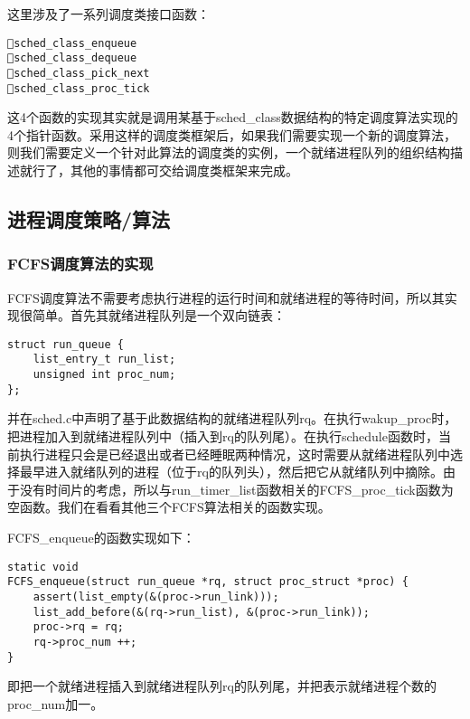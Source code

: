 这里涉及了一系列调度类接口函数：

\begin{lstlisting}
sched_class_enqueue
sched_class_dequeue
sched_class_pick_next
sched_class_proc_tick
\end{lstlisting}

这4个函数的实现其实就是调用某基于sched\_class数据结构的特定调度算法实现的4个指针函数。采用这样的调度类框架后，如果我们需要实现一个新的调度算法，则我们需要定义一个针对此算法的调度类的实例，一个就绪进程队列的组织结构描述就行了，其他的事情都可交给调度类框架来完成。

\subsection{进程调度策略/算法}\label{ux8fdbux7a0bux8c03ux5ea6ux7b56ux7565ux7b97ux6cd5}

\subsubsection{FCFS调度算法的实现}\label{fcfsux8c03ux5ea6ux7b97ux6cd5ux7684ux5b9eux73b0}

FCFS调度算法不需要考虑执行进程的运行时间和就绪进程的等待时间，所以其实现很简单。首先其就绪进程队列是一个双向链表：

\begin{lstlisting}
struct run_queue {
    list_entry_t run_list;
    unsigned int proc_num;
};
\end{lstlisting}

并在sched.c中声明了基于此数据结构的就绪进程队列rq。在执行wakup\_proc时，把进程加入到就绪进程队列中（插入到rq的队列尾）。在执行schedule函数时，当前执行进程只会是已经退出或者已经睡眠两种情况，这时需要从就绪进程队列中选择最早进入就绪队列的进程（位于rq的队列头），然后把它从就绪队列中摘除。由于没有时间片的考虑，所以与run\_timer\_list函数相关的FCFS\_proc\_tick函数为空函数。我们在看看其他三个FCFS算法相关的函数实现。

FCFS\_enqueue的函数实现如下：

\begin{lstlisting}
static void
FCFS_enqueue(struct run_queue *rq, struct proc_struct *proc) {
    assert(list_empty(&(proc->run_link)));
    list_add_before(&(rq->run_list), &(proc->run_link));
    proc->rq = rq;
    rq->proc_num ++;
}
\end{lstlisting}

即把一个就绪进程插入到就绪进程队列rq的队列尾，并把表示就绪进程个数的proc\_num加一。

